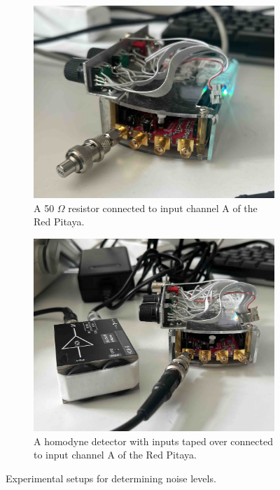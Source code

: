 \begin{figure}[ht]
    \centering
    \begin{subfigure}[t]{0.47\linewidth}
        \centering
        \includegraphics[width=\textwidth]{images/chapter_2/2_noise/noise_resistor.jpg}
        \caption{A 50 $\Omega$ resistor connected to input channel A of the Red Pitaya.}
        \label{fig:ch2_resistor_noise}
    \end{subfigure}
    \hspace{.025\linewidth}
    \begin{subfigure}[t]{0.47\linewidth}
        \centering
        \includegraphics[width=\textwidth]{images/chapter_2/2_noise/noise_homo.jpg}
        \caption{A homodyne detector with inputs taped over connected to input channel A of the Red Pitaya.}
        \label{fig:ch2_homo_noise}
    \end{subfigure}
    \caption{Experimental setups for determining noise levels.}
    \label{fig:ch2_noise_setup}
\end{figure}

